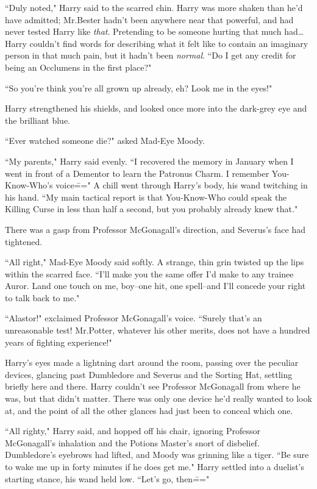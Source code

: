 ``Duly noted," Harry said to the scarred chin. Harry was more shaken than he'd have admitted; Mr.\?Bester hadn't been anywhere near that powerful, and had never tested Harry like \emph{that}. Pretending to be someone hurting that much had{\ldots} Harry couldn't find words for describing what it felt like to contain an imaginary person in that much pain, but it hadn't been \emph{normal}. ``Do I get any credit for being an Occlumens in the first place?"

``So you're think you're all grown up already, eh? Look me in the eyes!"

Harry strengthened his shields, and looked once more into the dark-grey eye and the brilliant blue.

``Ever watched someone die?" asked Mad-Eye Moody.

``My parents," Harry said evenly. ``I recovered the memory in January when I went in front of a Dementor to learn the Patronus Charm. I remember You-Know-Who's voice\===" A chill went through Harry's body, his wand twitching in his hand. ``My main tactical report is that You-Know-Who could speak the Killing Curse in less than half a second, but you probably already knew that."

There was a gasp from Professor McGonagall's direction, and Severus's face had tightened.

``All right," Mad-Eye Moody said softly. A strange, thin grin twisted up the lips within the scarred face. ``I'll make you the same offer I'd make to any trainee Auror. Land one touch on me, boy\---one hit, one spell\---and I'll concede your right to talk back to me."

``Alastor!" exclaimed Professor McGonagall's voice. ``Surely that's an unreasonable test! Mr.\?Potter, whatever his other merits, does not have a hundred years of fighting experience!"

Harry's eyes made a lightning dart around the room, passing over the peculiar devices, glancing past Dumbledore and Severus and the Sorting Hat, settling briefly here and there. Harry couldn't see Professor McGonagall from where he was, but that didn't matter. There was only one device he'd really wanted to look at, and the point of all the other glances had just been to conceal which one.

``All righty," Harry said, and hopped off his chair, ignoring Professor McGonagall's inhalation and the Potions Master's snort of disbelief. Dumbledore's eyebrows had lifted, and Moody was grinning like a tiger. ``Be sure to wake me up in forty minutes if he does get me." Harry settled into a duelist's starting stance, his wand held low. ``Let's go, then\==="

